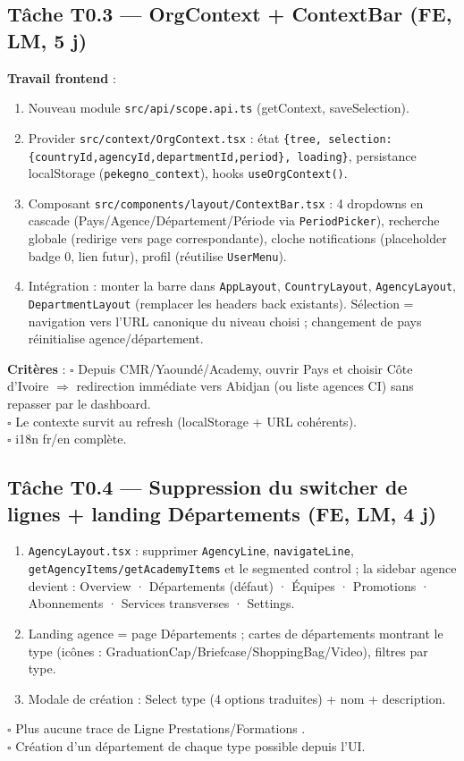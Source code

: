 \documentclass[11pt,a4paper]{article}
\newcommand{\tache}[2]{\subsection{Tâche #1 --- #2}\label{task:#1}}
\newcommand{\critere}{$\square$ }
\begin{document}
\tache{T0.3}{OrgContext + ContextBar (FE, LM, 5 j)}
\textbf{Travail frontend} :
\begin{enumerate}[nosep]
  \item Nouveau module \verb|src/api/scope.api.ts| (getContext, saveSelection).
  \item Provider \verb|src/context/OrgContext.tsx| : état \verb|{tree, selection:{countryId,agencyId,departmentId,period}, loading}|, persistance localStorage (\verb|pekegno_context|), hooks \verb|useOrgContext()|.
  \item Composant \verb|src/components/layout/ContextBar.tsx| : 4 dropdowns en cascade (Pays/Agence/Département/Période via \verb|PeriodPicker|), recherche globale (redirige vers page correspondante), cloche notifications (placeholder badge 0, lien futur), profil (réutilise \verb|UserMenu|).
  \item Intégration : monter la barre dans \verb|AppLayout|, \verb|CountryLayout|, \verb|AgencyLayout|, \verb|DepartmentLayout| (remplacer les headers back existants). Sélection = navigation vers l'URL canonique du niveau choisi ; changement de pays réinitialise agence/département.
\end{enumerate}
\textbf{Critères} :
\critere Depuis CMR/Yaoundé/Academy, ouvrir \og Pays \fg{} et choisir Côte d'Ivoire $\Rightarrow$ redirection immédiate vers Abidjan (ou liste agences CI) sans repasser par le dashboard. \\
\critere Le contexte survit au refresh (localStorage + URL cohérents). \\
\critere i18n fr/en complète.

\tache{T0.4}{Suppression du switcher de lignes + landing Départements (FE, LM, 4 j)}
\begin{enumerate}[nosep]
  \item \verb|AgencyLayout.tsx| : supprimer \verb|AgencyLine|, \verb|navigateLine|, \verb|getAgencyItems/getAcademyItems| et le segmented control ; la sidebar agence devient : Overview · Départements (défaut) · Équipes · Promotions · Abonnements · Services transverses · Settings.
  \item Landing agence = page Départements ; cartes de départements montrant le type (icônes : GraduationCap/Briefcase/ShoppingBag/Video), filtres par type.
  \item Modale de création : Select type (4 options traduites) + nom + description.
\end{enumerate}
\critere Plus aucune trace de \og Ligne Prestations/Formations \fg{}. \\
\critere Création d'un département de chaque type possible depuis l'UI.
\end{document}
